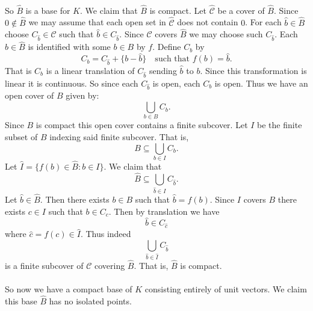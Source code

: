 \documentclass[letterpaper,12pt,oneside,onecolumn]{article}
\newcommand{\cC}{\mathcal{C}} \newcommand{\cD}{\mathcal{D}}
\begin{document}
\paragraph{}
So $\hat{B}$ is a base for $K$. We claim that $\hat{B}$ is compact. Let $\hat{\cC}$ be a cover of $\hat{B}$. Since $0 \not \in \hat{B}$ we may assume that each open set in $\hat{\cC}$ does not contain $0$. For each $\hat{b} \in \hat{B}$ choose $C_{\hat{b}} \in \cC$ such that $\hat{b} \in C_{\hat{b}}$. Since $\cC$ covers $\hat{B}$ we may choose such $C_{\hat{b}}$. Each $\hat{b} \in \hat{B}$ is identified with some $b \in B$ by $f$.  Define $C_b$ by
$$ C_b = C_{\hat{b}} +\{b -\hat{b}\} \quad \text{such that $f(b) = \hat{b}$}.$$
That is $C_b$ is a linear translation of $C_{\hat{b}}$ sending $\hat{b}$ to $b$. Since this transformation is linear it is continuous. So since each $C_{\hat{b}}$ is open, each $C_b$ is open. Thus we have an open cover of $B$ given by:
$$\bigcup_{b\in B} C_b.$$
Since $B$ is compact this open cover contains a finite subcover. Let $I$ be the finite subset of $B$ indexing said finite subcover. That is,
$$B \subseteq \bigcup_{b\in I} C_b.$$
Let $\hat{I} = \{f(b) \in \hat{B}: b \in I\}$. We claim that $$\hat{B} \subseteq \bigcup_{\hat{b} \in I} C_{\hat{b}}.$$
Let $\hat{b} \in \hat{B}$. Then there exists $b\in B$ such that $\hat{b} = f(b)$. Since $I$ covers $B$ there exists $c \in I$ such that $b \in C_c$. Then by translation we have
$$\hat{b} \in C_{\hat{c}}$$
where $\hat{c} = f(c) \in \hat{I}$. Thus indeed $$\bigcup_{\hat{b} \in \hat{I}} C_{\hat{b}}$$ is a finite subcover of $\cC$ covering $\hat{B}$. That is, $\hat{B}$ is compact.
\paragraph{}
So now we have a compact base of $K$ consisting entirely of unit vectors. We claim this base $\hat{B}$ has no isolated points.
\end{document}
